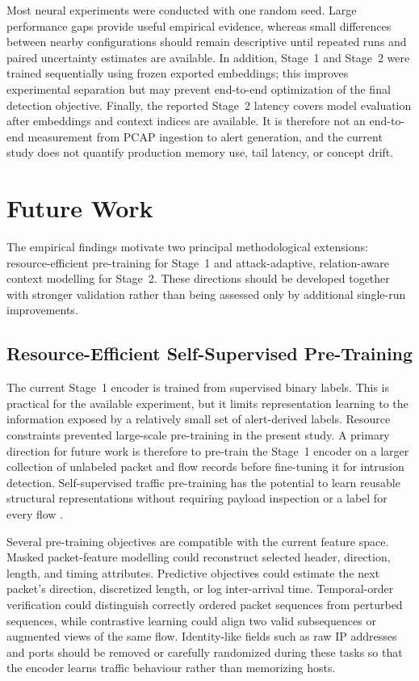 \documentclass[11pt,fleqn]{report}
\begin{document}
Most neural experiments were conducted with one random seed. Large performance
gaps provide useful empirical evidence, whereas small differences between
nearby configurations should remain descriptive until repeated runs and paired
uncertainty estimates are available. In addition, Stage~1 and Stage~2 were
trained sequentially using frozen exported embeddings; this improves
experimental separation but may prevent end-to-end optimization of the final
detection objective. Finally, the reported Stage~2 latency covers model
evaluation after embeddings and context indices are available. It is therefore
not an end-to-end measurement from PCAP ingestion to alert generation, and the
current study does not quantify production memory use, tail latency, or concept
drift.

\section{Future Work}
\label{subsec:conclusion_future_work}

The empirical findings motivate two principal methodological extensions:
resource-efficient pre-training for Stage~1 and attack-adaptive,
relation-aware context modelling for Stage~2. These directions should be
developed together with stronger validation rather than being assessed only by
additional single-run improvements.

\subsection{Resource-Efficient Self-Supervised Pre-Training}
\label{subsubsec:future_pretraining}

The current Stage~1 encoder is trained from supervised binary labels. This is
practical for the available experiment, but it limits representation learning
to the information exposed by a relatively small set of alert-derived labels.
Resource constraints prevented large-scale pre-training in the present study.
A primary direction for future work is therefore to pre-train the Stage~1
encoder on a larger collection of unlabeled packet and flow records before
fine-tuning it for intrusion detection. Self-supervised traffic pre-training has
the potential to learn reusable structural representations without requiring
payload inspection or a label for every flow
\cite{2024MAETraffic,Dong2025PretrainingEncrypted}.

Several pre-training objectives are compatible with the current feature space.
Masked packet-feature modelling could reconstruct selected header, direction,
length, and timing attributes. Predictive objectives could estimate the next
packet's direction, discretized length, or log inter-arrival time. Temporal-order
verification could distinguish correctly ordered packet sequences from
perturbed sequences, while contrastive learning could align two valid
subsequences or augmented views of the same flow. Identity-like fields such as
raw IP addresses and ports should be removed or carefully randomized during
these tasks so that the encoder learns traffic behaviour rather than memorizing
hosts.
\end{document}
